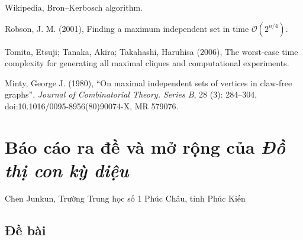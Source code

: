 \documentclass[11pt]{article}
\newcommand{\Oh}{\mathcal{O}}
\begin{document}
\begin{enumerate}[label={[\arabic*]}]
  \item Wikipedia, Bron--Kerbosch algorithm.

  \item Robson, J. M. (2001), Finding a maximum independent set in time
  \(\Oh(2^{n/4})\).

  \item Tomita, Etsuji; Tanaka, Akira; Takahashi, Haruhisa (2006), The
  worst-case time complexity for generating all maximal cliques and
  computational experiments.

  \item Minty, George J. (1980), ``On maximal independent sets of vertices in
  claw-free graphs'', \emph{Journal of Combinatorial Theory. Series B},
  28 (3): 284--304, doi:10.1016/0095-8956(80)90074-X, MR 579076.
\end{enumerate}

\section{Báo cáo ra đề và mở rộng của \texorpdfstring{\emph{Đồ thị con kỳ diệu}}{Đồ thị con kỳ diệu}}

\begin{center}
Chen Junkun, Trường Trung học số 1 Phúc Châu, tỉnh Phúc Kiến
\end{center}

\renewcommand{\abstractname}{Tóm tắt}
\begin{abstract}
\emph{Đồ thị con kỳ diệu} là một bài truyền thống do tôi ra trong đợt kiểm tra
chéo đội tuyển tập huấn năm 2017. Bằng cách làm yếu các điều kiện khác nhau
của bài toán, ta có thể chuyển nó thành các bài toán đồ thị thỏa những điều
kiện đặc thù khác nhau, rồi giải bằng nhiều thuật toán. Bài viết này tập
trung nghiên cứu một lớp bài toán DP có cập nhật trên đồ thị dưới một điều
kiện đặc biệt, đề xuất ``cây tròn--vuông'' và thuật toán dựa trên tư tưởng
phân trị theo chuỗi, đồng thời mở rộng ứng dụng của hai thuật toán đó. Tôi hy
vọng thông qua bài \emph{Đồ thị con kỳ diệu}, có thể chia sẻ với mọi người một
phương pháp xử lý chung cho một lớp thành phần song liên thông đỉnh và phương
pháp giải các bài toán DP trên cây có cập nhật.
\end{abstract}

\subsection{Đề bài}
\end{document}
